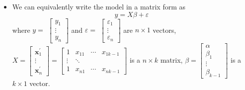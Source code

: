 \documentclass[notes=show]{beamer}
\begin{document}
\begin{frame}%


\begin{itemize}
\item We can equivalently write the model in a matrix form as 
\begin{equation}
y=X\beta +\varepsilon  \label{model}
\end{equation}%
where $y=$ $\left[ 
\begin{array}{c}
y_{1} \\ 
\vdots \\ 
y_{n}%
\end{array}%
\right] $ and $\varepsilon =$ $\left[ 
\begin{array}{c}
\varepsilon _{1} \\ 
\vdots \\ 
\varepsilon _{n}%
\end{array}%
\right] $ are $n\times 1$ vectors, $X=\left[ 
\begin{array}{c}
\mathbf{x}_{1}^{\prime } \\ 
\vdots \\ 
\mathbf{x}_{n}^{\prime }%
\end{array}%
\right] =\left[ 
\begin{array}{cccc}
1 & x_{11} & \cdots & x_{1k-1} \\ 
\vdots & \ddots &  &  \\ 
1 & x_{n1} & \cdots & x_{nk-1}%
\end{array}%
\right] $ is a $n\times k$ matrix, $\beta =\left[ 
\begin{array}{c}
\alpha \\ 
\beta _{1} \\ 
\vdots \\ 
\beta _{k-1}%
\end{array}%
\right] $ is a $k\times 1$ vector.
\end{itemize}

\end{frame}%
\end{document}
